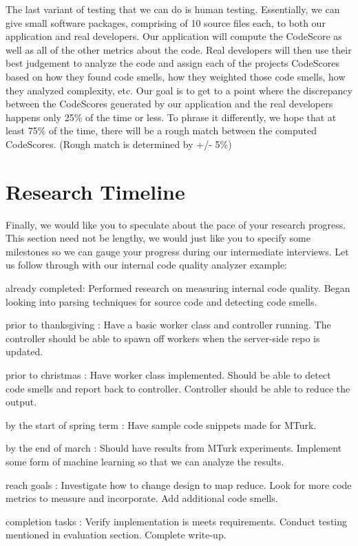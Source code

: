 \documentclass{sig-alternate}
\begin{document}
The last variant of testing that we can do is human testing. Essentially, we can give small software packages, comprising of 10 source files each, to both our application and real developers. Our application will compute the CodeScore as well as all of the other metrics about the code. Real developers will then use their best judgement to analyze the code and assign each of the projects CodeScores based on how they found code smells, how they weighted those code smells, how they analyzed complexity, etc. Our goal is to get to a point where the discrepancy between the CodeScores generated by our application and the real developers happens only 25\% of the time or less. To phrase it differently, we hope that at least 75\% of the time, there will be a rough match between the computed CodeScores. (Rough match is determined by +/- 5\%)
\section{Research Timeline}
\label{sec:research_timeline}
Finally, we would like you to speculate about the pace of your
research progress. This section need not be lengthy, we would just
like you to specify some milestones so we can gauge your progress
during our intermediate interviews. Let us follow through with our
internal code quality analyzer example:
\begin{itemize*}
	\item {\sc already completed}: Performed research on measuring internal code quality. Began looking into parsing techniques for source code and detecting code smells.\vspace{3pt}
	\item {\sc prior to thanksgiving} : Have a basic worker class and controller running. The controller should be able to spawn off workers when the server-side repo is updated.\vspace{3pt}
	\item {\sc prior to christmas} : Have worker class implemented. Should be able to detect code smells and report back to controller. Controller should be able to reduce the output.\vspace{3pt}
\item {\sc by the start of spring term} : Have sample code snippets made for MTurk.\vspace{3pt}	
\item {\sc by the end of march} : Should have results from MTurk experiments. Implement some form of machine learning so that we can analyze the results.\vspace{3pt}
\item {\sc reach goals} : Investigate how to change design to map reduce. Look for more code metrics to measure and incorporate. Add additional code smells. \vspace{3pt}
\item {\sc completion tasks} : Verify implementation is meets requirements. Conduct testing mentioned in evaluation section. Complete write-up.\vspace{3pt}
\end{itemize*}
\end{document}
